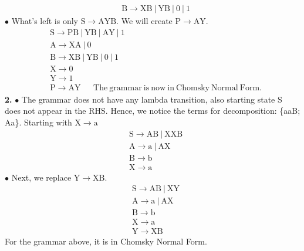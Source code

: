 \documentclass{report}
\begin{document}
{\begin{equation*}
\begin{aligned}
        &\mathrm{B} \longrightarrow \mathrm{XB~|~YB~|~0~|~1} 
    \end{aligned}
\end{equation*}
\newline
$\bullet$ What's left is only $\mathrm{S} \longrightarrow \mathrm{AYB}$.
We will create $\mathrm{P} \longrightarrow \mathrm{AY}$.
\begin{equation*}
    \begin{aligned}
        &\mathrm{S} \longrightarrow \mathrm{PB~|~YB~|~AY~|~1} \\
        &\mathrm{A} \longrightarrow \mathrm{XA~|~0} \\
        &\mathrm{B} \longrightarrow \mathrm{XB~|~YB~|~0~|~1} \\
        &\mathrm{X} \longrightarrow 0 \\
        &\mathrm{Y} \longrightarrow 1 \\
        &\mathrm{P} \longrightarrow \mathrm{AY}~~~~~~~\mathrm{The~grammar~is~now~in~Chomsky~Normal~Form.}
    \end{aligned}
\end{equation*}
\newline
\textbf{2.}\newline
$\bullet$ The grammar does not have any lambda transition, also starting state S does not appear in the RHS.
Hence, we notice the terms for decomposition: \{aaB; Aa\}. Starting with $\mathrm{X} \longrightarrow \mathrm{a}$
\begin{equation*}
    \begin{aligned}
        & \mathrm{S} \longrightarrow \mathrm{AB~|~XXB} \\
        & \mathrm{A} \longrightarrow \mathrm{a~|~AX} \\
        & \mathrm{B} \longrightarrow \mathrm{b} \\
        & \mathrm{X} \longrightarrow \mathrm{a}
    \end{aligned}
\end{equation*}
\newline
$\bullet$ Next, we replace $\mathrm{Y} \longrightarrow \mathrm{XB}$.
\begin{equation*}
    \begin{aligned}
        & \mathrm{S} \longrightarrow \mathrm{AB~|~XY} \\
        & \mathrm{A} \longrightarrow \mathrm{a~|~AX} \\
        & \mathrm{B} \longrightarrow \mathrm{b} \\
        & \mathrm{X} \longrightarrow \mathrm{a} \\
        & \mathrm{Y} \longrightarrow \mathrm{XB}
    \end{aligned}
\end{equation*}
\newline
For the grammar above, it is in Chomsky Normal Form. \\~\\

}
\end{document}
